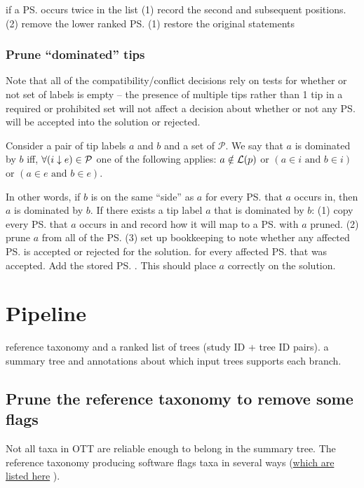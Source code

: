 \documentclass[11pt]{article}
\begin{document}
\simplification if a \ps occurs twice in the list (1) record the second and subsequent positions. (2) remove the lower ranked \ps
\undoActions (1) restore the original statements

\subsubsection{Prune ``dominated'' tips}
Note that all of the compatibility/conflict decisions rely on tests for whether or not
    set of labels is empty -- the presence of multiple tips rather than 1 tip in a
    required or prohibited set will not affect a decision about whether or not any
    \ps will be accepted into the solution or rejected.

Consider a pair of tip labels $a$ and $b$ and a set of \pss $\mathcal{P}$.
We say that $a$ is dominated by $b$ iff, $\forall ({i}\downarrow{e}) \in \mathcal{P}$ one of the 
    following applies:
    $a\notin \mathcal{L}(p)$
    or $(a \in i \mbox{ and } b \in i)$
    or $(a \in e \mbox{ and } b \in e)$.

In other words, if $b$ is on the same ``side'' as $a$ for every \ps that $a$ occurs in, then
 $a$ is dominated by $b$.
 \simplification  If there exists a tip label $a$ that is dominated by $b$:
    (1) copy every \ps that $a$ occurs in and record how it will map to a \ps with $a$ pruned.
    (2) prune $a$ from all of the \ps
    (3) set up bookkeeping to note whether any affected \ps is accepted or rejected for the solution.
\undoActions for every affected \ps that was accepted. Add the stored \ps. This should place $a$ correctly on the solution.


\section{Pipeline}
\stepInput reference taxonomy and a ranked list of trees (study ID + tree ID pairs).
\stepOutput a summary tree and annotations about which input trees supports each branch.


\subsection{Prune the reference taxonomy to remove some flags}
\stepExplanation Not all taxa in OTT are reliable enough to belong in the 
    summary tree.
The reference taxonomy producing software flags taxa in several ways 
(\href{https://github.com/OpenTreeOfLife/reference-taxonomy/wiki/taxon-flags}{which are listed here}
).
\end{document}

